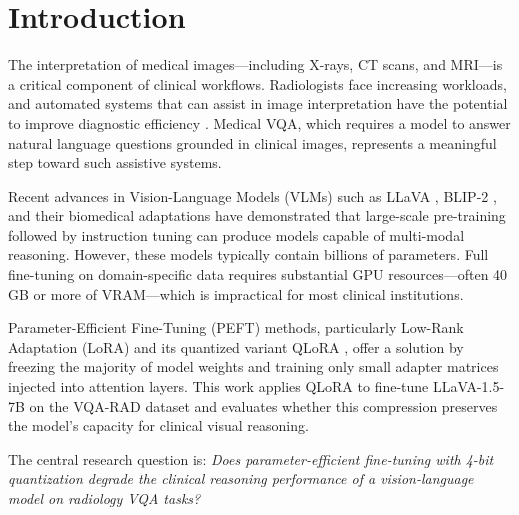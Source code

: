 \section{Introduction}
\label{sec:introduction}

The interpretation of medical images---including X-rays, CT scans, and MRI---is a critical component of clinical workflows. Radiologists face increasing workloads, and automated systems that can assist in image interpretation have the potential to improve diagnostic efficiency \cite{lau2018dataset}. Medical VQA, which requires a model to answer natural language questions grounded in clinical images, represents a meaningful step toward such assistive systems.

Recent advances in Vision-Language Models (VLMs) such as LLaVA \cite{liu2023visual, liu2024improved}, BLIP-2 \cite{li2023blip2}, and their biomedical adaptations \cite{li2023llavamed} have demonstrated that large-scale pre-training followed by instruction tuning can produce models capable of multi-modal reasoning. However, these models typically contain billions of parameters. Full fine-tuning on domain-specific data requires substantial GPU resources---often 40 GB or more of VRAM---which is impractical for most clinical institutions.

Parameter-Efficient Fine-Tuning (PEFT) methods, particularly Low-Rank Adaptation (LoRA) \cite{hu2022lora} and its quantized variant QLoRA \cite{dettmers2024qlora}, offer a solution by freezing the majority of model weights and training only small adapter matrices injected into attention layers. This work applies QLoRA to fine-tune LLaVA-1.5-7B on the VQA-RAD dataset and evaluates whether this compression preserves the model's capacity for clinical visual reasoning.

The central research question is: \textit{Does parameter-efficient fine-tuning with 4-bit quantization degrade the clinical reasoning performance of a vision-language model on radiology VQA tasks?}
